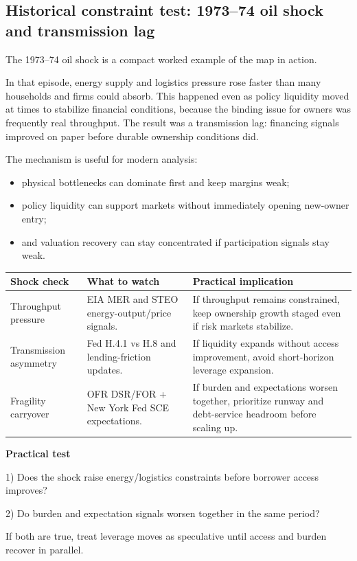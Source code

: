 \documentclass[11pt,openany]{book}
\begin{document}
\subsection{Historical constraint test: 1973--74 oil shock and transmission lag}
\label{subsec:oil-shock-mechanism}

The 1973--74 oil shock is a compact worked example of the map in action.

In that episode, energy supply and logistics pressure rose faster than many households and firms could absorb. This happened even as policy liquidity moved at times to stabilize financial conditions, because the binding issue for owners was frequently real throughput. The result was a transmission lag: financing signals improved on paper before durable ownership conditions did.

The mechanism is useful for modern analysis:
\begin{itemize}
  \item physical bottlenecks can dominate first and keep margins weak;
  \item policy liquidity can support markets without immediately opening new-owner entry;
  \item and valuation recovery can stay concentrated if participation signals stay weak.
\end{itemize}

\begin{center}
\small
\begin{tabularx}{\textwidth}{>{\raggedright\arraybackslash}p{}>{\raggedright\arraybackslash}p{}X}
\toprule
\textbf{Shock check} & \textbf{What to watch} & \textbf{Practical implication} \\
\midrule
Throughput pressure & EIA MER and STEO energy-output/price signals. & If throughput remains constrained, keep ownership growth staged even if risk markets stabilize. \\
Transmission asymmetry & Fed H.4.1 vs H.8 and lending-friction updates. & If liquidity expands without access improvement, avoid short-horizon leverage expansion. \\
Fragility carryover & OFR DSR/FOR + New York Fed SCE expectations. & If burden and expectations worsen together, prioritize runway and debt-service headroom before scaling up. \\
\bottomrule
\end{tabularx}
\normalsize
\end{center}

\begin{signalbox}
\textbf{Practical test}\par
1) Does the shock raise energy/logistics constraints before borrower access improves?\par
2) Do burden and expectation signals worsen together in the same period?\par
If both are true, treat leverage moves as speculative until access and burden recover in parallel.
\end{signalbox}
\end{document}
